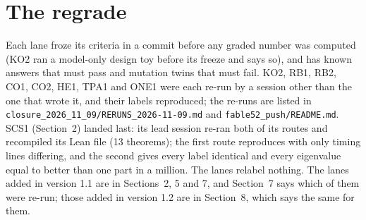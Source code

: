 \documentclass[10pt]{article}
\begin{document}
\section{The regrade}
Each lane froze its criteria in a commit before any graded number was computed (KO2 ran a model-only design toy before its freeze and says so), and has known answers that must pass and mutation twins that must fail. KO2, RB1, RB2, CO1, CO2, HE1, TPA1 and ONE1 were each re-run by a session other than the one that wrote it, and their labels reproduced; the re-runs are listed in \texttt{closure\_2026\_11\_09/RERUNS\_2026-11-09.md} and \texttt{fable52\_push/README.md}. SCS1 (Section~2) landed last: its lead session re-ran both of its routes and recompiled its Lean file (13 theorems); the first route reproduces with only timing lines differing, and the second gives every label identical and every eigenvalue equal to better than one part in a million. The lanes relabel nothing. The lanes added in version 1.1 are in Sections~2, 5 and 7, and Section~7 says which of them were re-run; those added in version 1.2 are in Section~8, which says the same for them.
\end{document}
